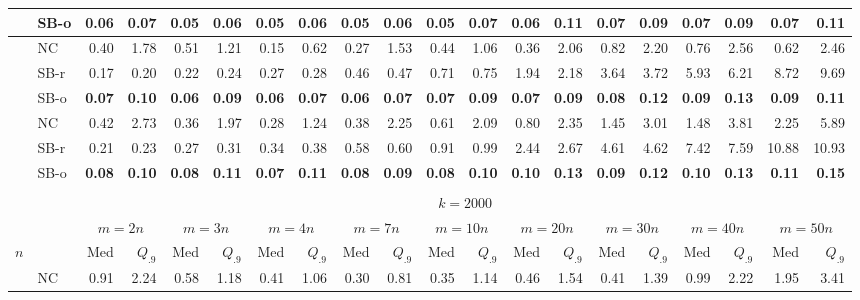 \documentclass[runningheads,a4paper]{llncs}
\begin{document}
\begin{sidewaystable}
\begin{tabularx}{1\textwidth}{p{0.8cm}p{0.8cm}|RR|RR|RR|RR|RR|RR|RR|RR|RR}
 & \centering SB-o  & \textbf{0.06} & \textbf{0.07} & \textbf{0.05} & \textbf{0.06} & \textbf{0.05} & \textbf{0.06} & \textbf{0.05} & \textbf{0.06} & \textbf{0.05} & \textbf{0.07} & \textbf{0.06} & \textbf{0.11} & \textbf{0.07} & \textbf{0.09} & \textbf{0.07} & \textbf{0.09} & \textbf{0.07} & \textbf{0.11} \\
\hline
\centering{} & \centering NC & 0.40 & 1.78 & 0.51 & 1.21 & 0.15 & 0.62 & 0.27 & 1.53 & 0.44 & 1.06 & 0.36 & 2.06 & 0.82 & 2.20 & 0.76 & 2.56 & 0.62 & 2.46 \\
 & \centering SB-r  & 0.17 & 0.20 & 0.22 & 0.24 & 0.27 & 0.28 & 0.46 & 0.47 & 0.71 & 0.75 & 1.94 & 2.18 & 3.64 & 3.72 & 5.93 & 6.21 & 8.72 & 9.69 \\
 & \centering SB-o  & \textbf{0.07} & \textbf{0.10} & \textbf{0.06} & \textbf{0.09} & \textbf{0.06} & \textbf{0.07} & \textbf{0.06} & \textbf{0.07} & \textbf{0.07} & \textbf{0.09} & \textbf{0.07} & \textbf{0.09} & \textbf{0.08} & \textbf{0.12} & \textbf{0.09} & \textbf{0.13} & \textbf{0.09} & \textbf{0.11} \\
\hline
\centering{} & \centering NC & 0.42 & 2.73 & 0.36 & 1.97 & 0.28 & 1.24 & 0.38 & 2.25 & 0.61 & 2.09 & 0.80 & 2.35 & 1.45 & 3.01 & 1.48 & 3.81 & 2.25 & 5.89 \\
 & \centering SB-r  & 0.21 & 0.23 & 0.27 & 0.31 & 0.34 & 0.38 & 0.58 & 0.60 & 0.91 & 0.99 & 2.44 & 2.67 & 4.61 & 4.62 & 7.42 & 7.59 & 10.88 & 10.93 \\
 & \centering SB-o  & \textbf{0.08} & \textbf{0.10} & \textbf{0.08} & \textbf{0.11} & \textbf{0.07} & \textbf{0.11} & \textbf{0.08} & \textbf{0.09} & \textbf{0.08} & \textbf{0.10} & \textbf{0.10} & \textbf{0.13} & \textbf{0.09} & \textbf{0.12} & \textbf{0.10} & \textbf{0.13} & \textbf{0.11} & \textbf{0.15} \\
\hline
\\
  & &  \\
  & &  &  &  &  &  &  &  &  &  \\
\centering $n$ & & Med & $Q_{.9}$ & Med & $Q_{.9}$ & Med & $Q_{.9}$ & Med & $Q_{.9}$ & Med & $Q_{.9}$ & Med & $Q_{.9}$ & Med & $Q_{.9}$ & Med & $Q_{.9}$ & Med & $Q_{.9}$ \\
\hline
\centering{} & \centering NC & 0.91 & 2.24 & 0.58 & 1.18 & 0.41 & 1.06 & 0.30 & 0.81 & 0.35 & 1.14 & 0.46 & 1.54 & 0.41 & 1.39 & 0.99 & 2.22 & 1.95 & 3.41 \\

\end{tabularx}
\end{sidewaystable}
\end{document}
